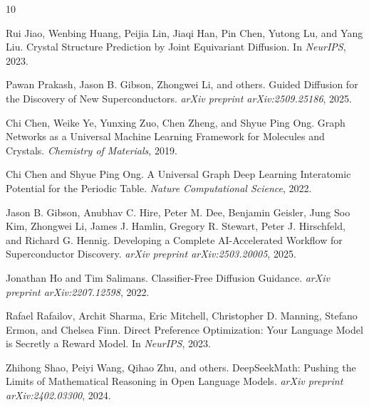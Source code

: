 \documentclass{article}
\begin{document}
\begin{thebibliography}{10}

Rui Jiao, Wenbing Huang, Peijia Lin, Jiaqi Han, Pin Chen, Yutong Lu, and Yang Liu.
\newblock Crystal Structure Prediction by Joint Equivariant Diffusion.
\newblock In \emph{NeurIPS}, 2023.

Pawan Prakash, Jason B. Gibson, Zhongwei Li, and others.
\newblock Guided Diffusion for the Discovery of New Superconductors.
\newblock \emph{arXiv preprint arXiv:2509.25186}, 2025.

Chi Chen, Weike Ye, Yunxing Zuo, Chen Zheng, and Shyue Ping Ong.
\newblock Graph Networks as a Universal Machine Learning Framework for Molecules and Crystals.
\newblock \emph{Chemistry of Materials}, 2019.

Chi Chen and Shyue Ping Ong.
\newblock A Universal Graph Deep Learning Interatomic Potential for the Periodic Table.
\newblock \emph{Nature Computational Science}, 2022.

Jason B. Gibson, Anubhav C. Hire, Peter M. Dee, Benjamin Geisler, Jung Soo Kim, Zhongwei Li, James J. Hamlin, Gregory R. Stewart, Peter J. Hirschfeld, and Richard G. Hennig.
\newblock Developing a Complete AI-Accelerated Workflow for Superconductor Discovery.
\newblock \emph{arXiv preprint arXiv:2503.20005}, 2025.

Jonathan Ho and Tim Salimans.
\newblock Classifier-Free Diffusion Guidance.
\newblock \emph{arXiv preprint arXiv:2207.12598}, 2022.

Rafael Rafailov, Archit Sharma, Eric Mitchell, Christopher D. Manning, Stefano Ermon, and Chelsea Finn.
\newblock Direct Preference Optimization: Your Language Model is Secretly a Reward Model.
\newblock In \emph{NeurIPS}, 2023.

Zhihong Shao, Peiyi Wang, Qihao Zhu, and others.
\newblock DeepSeekMath: Pushing the Limits of Mathematical Reasoning in Open Language Models.
\newblock \emph{arXiv preprint arXiv:2402.03300}, 2024.

\end{thebibliography}
\end{document}
